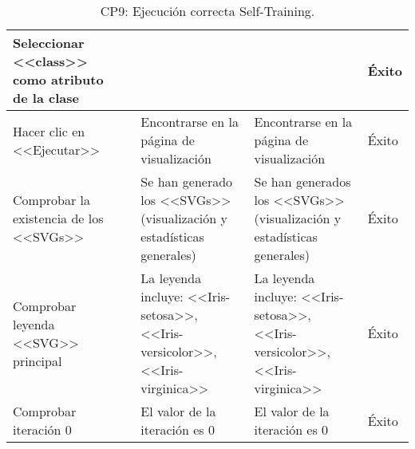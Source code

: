 \begin{center}
\begin{table}[H]
\begin{tabular}{p{}p{}p{}p{}p{}}
    Seleccionar <<class>> como atributo de la clase &                & & & Éxito \\ \hline
    Hacer clic en <<Ejecutar>>                            &                        & Encontrarse en la página de visualización                            & Encontrarse en la página de visualización                    & Éxito                            \\ \hline
    Comprobar la existencia de los <<SVGs>>               &                        & Se han generado los <<SVGs>> (visualización y estadísticas generales) & Se han generados los <<SVGs>> (visualización y estadísticas generales)& Éxito  \\ \hline 
    Comprobar leyenda <<SVG>> principal                   &                        & La leyenda incluye: <<Iris-setosa>>, <<Iris-versicolor>>, <<Iris-virginica>> & La leyenda incluye: <<Iris-setosa>>, <<Iris-versicolor>>, <<Iris-virginica>> & Éxito \\ \hline
    Comprobar iteración 0                                 &                        & El valor de la iteración es 0                                        & El valor de la iteración es 0                                & Éxito \\ \hline
    \end{tabular}
    \caption{CP9: Ejecución correcta Self-Training.}
    \end{table}
    \end{center}
    
